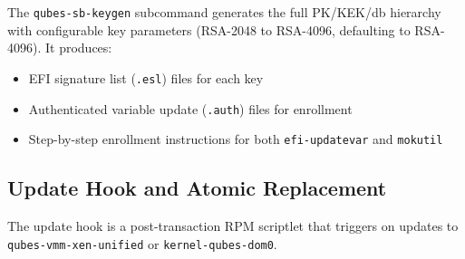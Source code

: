 \documentclass[12pt, a4paper]{article}
\begin{document}
The \texttt{qubes-sb-keygen} subcommand generates the full PK/KEK/db hierarchy with configurable key parameters (RSA-2048 to RSA-4096, defaulting to RSA-4096). It produces:
\begin{itemize}
    \item EFI signature list (\texttt{.esl}) files for each key
    \item Authenticated variable update (\texttt{.auth}) files for enrollment
    \item Step-by-step enrollment instructions for both \texttt{efi-updatevar} and \texttt{mokutil}
\end{itemize}

\subsection{Update Hook and Atomic Replacement}

The update hook is a post-transaction RPM scriptlet that triggers on updates to \texttt{qubes-vmm-xen-unified} or \texttt{kernel-qubes-dom0}.
\end{document}
